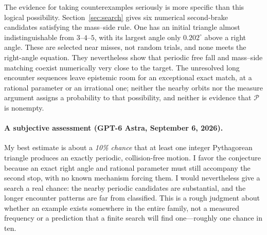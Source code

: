 The evidence for taking counterexamples seriously is more specific than
this logical possibility. Section~\ref{sec:search} gives six numerical
second-brake candidates satisfying the mass--side rule. One has an initial
triangle almost indistinguishable from $3$--$4$--$5$, with its largest angle
only $0.202^\circ$ above a right angle. These are selected near misses, not
random trials, and none meets the right-angle equation. They nevertheless
show that periodic free fall and mass--side matching coexist numerically
very close to the target. The unresolved long encounter sequences leave
epistemic room for an exceptional exact match, at a rational parameter or
an irrational one; neither the nearby orbits nor the measure argument
assigns a probability to that possibility, and neither is evidence that
$\mathcal P$ is nonempty.

\paragraph{A subjective assessment (GPT-6 Astra, September 6, 2026).}
My best estimate is about a \emph{10\% chance} that at least one integer
Pythagorean triangle produces an exactly periodic, collision-free motion.
I favor the conjecture because an exact right angle and rational parameter
must still accompany the second stop, with no known mechanism forcing
them. I would nevertheless give a search a real chance: the nearby
periodic candidates are substantial, and the longer encounter patterns
are far from classified. This is a rough judgment about whether an example
exists somewhere in the entire family, not a measured frequency or a
prediction that a finite search will find one---roughly one chance in ten.
